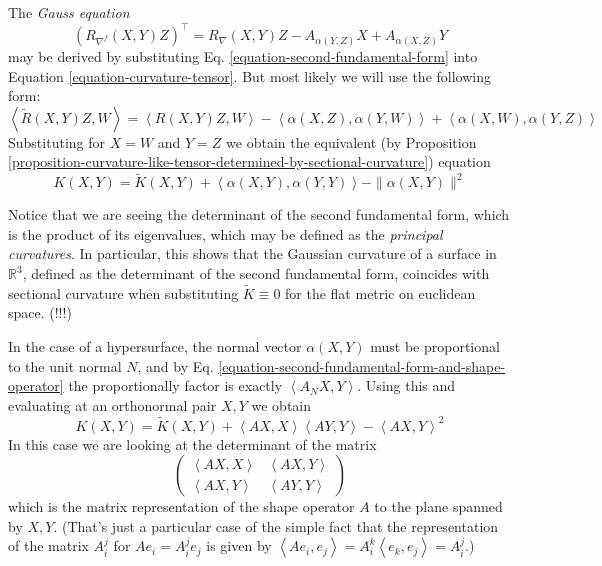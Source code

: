 The {\it Gauss equation}
$$
(R_{\nabla^f}(X,Y)Z)^\top=R_\nabla(X,Y)Z-A_{\alpha(Y,Z)}X+A_{\alpha(X,Z)}Y
$$
may be derived by substituting Eq. \ref{equation-second-fundamental-form} 
into Equation \ref{equation-curvature-tensor}. But most likely we will use the
following form:
\begin{equation}
\label{equation-Gauss}
\left<\tilde{R}(X,Y)Z,W\right>=\left<R(X,Y)Z,W\right>
-\left<\alpha(X,Z),\alpha(Y,W)\right>+\left<\alpha(X,W),\alpha(Y,Z)\right>
\end{equation}
Substituting for $X=W$ and $Y=Z$ we obtain the equivalent (by Proposition
\ref{proposition-curvature-like-tensor-determined-by-sectional-curvature}) 
equation 
\begin{equation}
\label{equation-Gauss-sectional-curvature}
K(X,Y)=\tilde{K}(X,Y)+\left<\alpha(X,Y),\alpha(Y,Y)\right>-\|\alpha(X,Y)\|^2
\end{equation}

Notice that we are seeing the determinant of the second fundamental form, which
is the product of its eigenvalues, which may be defined as the {\it principal
curvatures}. In particular, this shows that the Gaussian curvature of a surface 
in $\mathbb{R}^3$, defined as the determinant of the second fundamental form, 
coincides with sectional curvature when substituting $\tilde{K}\equiv0$ for
 the flat metric on euclidean space. (!!!)

In the case of a hypersurface, the normal vector $\alpha(X,Y)$ must be
proportional to the unit normal $N$, and by Eq.
\ref{equation-second-fundamental-form-and-shape-operator} the proportionally
factor is exactly $\left<A_N X,Y\right>$. Using this and evaluating
 at an orthonormal pair $X,Y$ we obtain
\begin{equation}
\label{equation-Gauss-sectional-curvature-shape-operator}
K(X,Y)=\tilde{K}(X,Y)+\left<AX,X\right>\left<AY,Y\right>-\left<AX,Y\right>^2
\end{equation}
In this case we are looking at the determinant of the matrix
\begin{equation}
\label{equation-matrix-of-shape-operator}
\begin{pmatrix}
\left<AX,X\right>&\left<AX,Y\right>\\ 
\left<AX,Y\right>&\left<AY,Y\right>
\end{pmatrix}
\end{equation}
which is the matrix representation of the shape operator $A$ to the plane
spanned by $X,Y$. (That's just a particular case of the simple fact that the
representation of the matrix $A_i^j$ for $Ae_i=A_i^je_j$ is given by
$\left<Ae_i,e_j\right>=A^k_i\left<e_k,e_j\right>=A^j_i$.)

